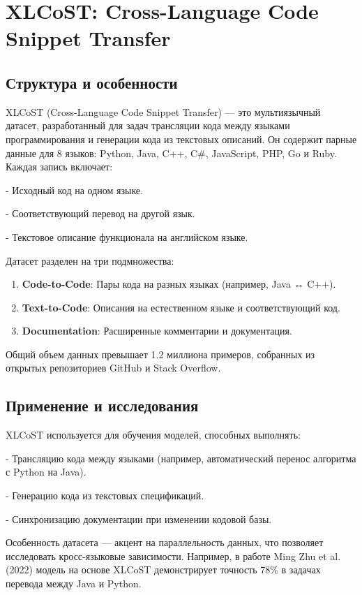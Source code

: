 \documentclass[14pt]{article}
\theoremstyle{definition}
\begin{document}
 
 \newpage
 \section{XLCoST: Cross-Language Code Snippet Transfer}

\subsection{Структура и особенности}
XLCoST (Cross-Language Code Snippet Transfer) — это мультиязычный датасет, разработанный для задач трансляции кода между языками программирования и генерации кода из текстовых описаний. Он содержит парные данные для 8 языков: Python, Java, C++, C\#, JavaScript, PHP, Go и Ruby. Каждая запись включает:

    
- Исходный код на одном языке.
    
- Соответствующий перевод на другой язык.
    
- Текстовое описание функционала на английском языке.


Датасет разделен на три подмножества:
\begin{enumerate}
    \item \textbf{Code-to-Code}: Пары кода на разных языках (например, Java ↔ C++).
    \item \textbf{Text-to-Code}: Описания на естественном языке и соответствующий код.
    \item \textbf{Documentation}: Расширенные комментарии и документация.
\end{enumerate}

Общий объем данных превышает 1.2 миллиона примеров, собранных из открытых репозиториев GitHub и Stack Overflow.

\subsection{Применение и исследования}
XLCoST используется для обучения моделей, способных выполнять:

    
- Трансляцию кода между языками (например, автоматический перенос алгоритма с Python на Java).
    
- Генерацию кода из текстовых спецификаций.
    
- Синхронизацию документации при изменении кодовой базы.


Особенность датасета — акцент на параллельность данных, что позволяет исследовать кросс-языковые зависимости. Например, в работе Ming Zhu et al. (2022) модель на основе XLCoST демонстрирует точность 78\% в задачах перевода между Java и Python.
\end{document}
